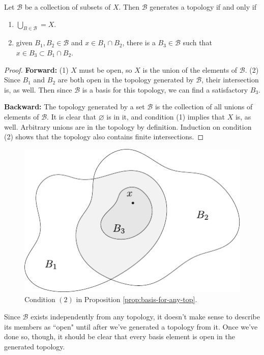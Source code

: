 \documentclass[10pt]{report}
\begin{document}
\begin{prop}
\label{prop:basis-for-any-top}
Let $\mathcal{B}$ be a collection of subsets of $X$. Then $\mathcal{B}$ generates a topology if and only if
\begin{enumerate}
	\item $\bigcup_{B \in \mathcal{B}}=X$.
	\item given $B_1,B_2 \in \mathcal{B}$ and $x \in B_1 \cap B_2$, there is a $B_3 \in \mathcal{B}$ such that $x \in B_3 \subset B_1 \cap B_2$.
\end{enumerate}
\end{prop}
\begin{proof}
	\textbf{Forward:} (1) $X$ must be open, so $X$ is the union of the elements of $\mathcal{B}$. (2) Since $B_1$ and $B_2$ are both open in the topology generated by $\mathcal{B}$, their intersection is, as well. Then since $\mathcal{B}$ is a basis for this topology, we can find a satisfactory $B_3$.

	\textbf{Backward:} The topology generated by a set $\mathcal{B}$ is the collection of all unions of elements of $\mathcal{B}$. It is clear that $\varnothing$ is in it, and condition (1) implies that $X$ is, as well. Arbitrary unions are in the topology by definition. Induction on condition (2) shows that the topology also contains finite intersections.
\end{proof}

\begin{figure}[H]
	\centering
	\includegraphics[scale=1]{fig/basis.pdf}
	\caption{Condition $(2)$ in Proposition \ref{prop:basis-for-any-top}.}
\end{figure}

\begin{note}
Since $\mathcal{B}$ exists independently from any topology, it doesn't make sense to describe its members as ``open" until after we've generated a topology from it. Once we've done so, though, it should be clear that every basis element is open in the generated topology.
\end{note}
\end{document}
